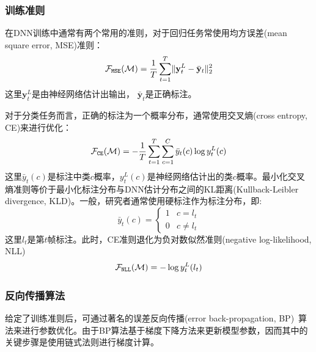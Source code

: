 \subsubsection{训练准则}
在DNN训练中通常有两个常用的准则，对于回归任务常使用均方误差(mean square error, MSE)准则：
\begin{equation}
    \mathcal{F}_{\tt MSE}(\mathcal{M}) = \frac{1}{T}\sum_{t=1}^T \lVert \mathbf{y}_t^L - \bar{\mathbf{y}}_t \rVert^2_2
\end{equation}
这里$\mathbf{y}_t^L$是由神经网络估计出输出， $\bar{\mathbf{y}}_t$是正确标注。

对于分类任务而言，正确的标注为一个概率分布，通常使用交叉熵(cross entropy, CE)来进行优化：
\begin{equation}
    \mathcal{F}_{\tt CE}(\mathcal{M}) = - \frac{1}{T}\sum_{t=1}^T \sum_{c=1}^C \bar{y}_t(c) \log y_t^L(c)
\end{equation}
这里$\bar{y}_t(c)$是标注中类$c$概率，$y_t^L(c)$是神经网络估计出的类$c$概率。最小化交叉熵准则等价于最小化标注分布与DNN估计分布之间的KL距离(Kullback-Leibler divergence, KLD)。一般，研究者通常使用硬标注作为标注分布，即:
\begin{equation}
    \bar{y}_t(c) = 
    \begin{cases} 
        1& c=l_t \\ 
        0& c \ne l_t 
    \end{cases}
\end{equation}
这里$l_t$是第$t$帧标注。此时，CE准则退化为负对数似然准则(negative log-likelihood, NLL)
\begin{equation}
    \mathcal{F}_{\tt NLL}(\mathcal{M}) = -\log y^L_t(l_t)
\end{equation}

\subsubsection{反向传播算法}
给定了训练准则后，可通过著名的误差反向传播(error back-propagation, BP)~\cite{rumelhart1986learning}算法来进行参数优化。由于BP算法基于梯度下降方法来更新模型参数，因而其中的关键步骤是使用链式法则进行梯度计算。

